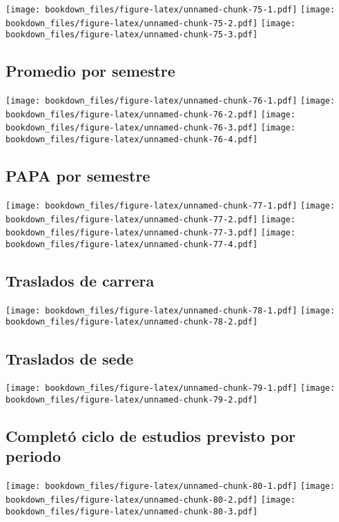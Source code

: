 \documentclass[]{article}
\theoremstyle{definition}
\theoremstyle{definition}
\theoremstyle{definition}
\theoremstyle{remark}
\begin{document}
\texttt{[image: bookdown\_files/figure-latex/unnamed-chunk-75-1.pdf]}
\texttt{[image: bookdown\_files/figure-latex/unnamed-chunk-75-2.pdf]}
\texttt{[image: bookdown\_files/figure-latex/unnamed-chunk-75-3.pdf]}

\subsection{Promedio por semestre}\label{promedio-por-semestre}

\texttt{[image: bookdown\_files/figure-latex/unnamed-chunk-76-1.pdf]}
\texttt{[image: bookdown\_files/figure-latex/unnamed-chunk-76-2.pdf]}
\texttt{[image: bookdown\_files/figure-latex/unnamed-chunk-76-3.pdf]}
\texttt{[image: bookdown\_files/figure-latex/unnamed-chunk-76-4.pdf]}

\subsection{PAPA por semestre}\label{papa-por-semestre}

\texttt{[image: bookdown\_files/figure-latex/unnamed-chunk-77-1.pdf]}
\texttt{[image: bookdown\_files/figure-latex/unnamed-chunk-77-2.pdf]}
\texttt{[image: bookdown\_files/figure-latex/unnamed-chunk-77-3.pdf]}
\texttt{[image: bookdown\_files/figure-latex/unnamed-chunk-77-4.pdf]}

\subsection{Traslados de carrera}\label{traslados-de-carrera}

\texttt{[image: bookdown\_files/figure-latex/unnamed-chunk-78-1.pdf]}
\texttt{[image: bookdown\_files/figure-latex/unnamed-chunk-78-2.pdf]}

\subsection{Traslados de sede}\label{traslados-de-sede}

\texttt{[image: bookdown\_files/figure-latex/unnamed-chunk-79-1.pdf]}
\texttt{[image: bookdown\_files/figure-latex/unnamed-chunk-79-2.pdf]}

\subsection{Completó ciclo de estudios previsto por
periodo}\label{completo-ciclo-de-estudios-previsto-por-periodo}

\texttt{[image: bookdown\_files/figure-latex/unnamed-chunk-80-1.pdf]}
\texttt{[image: bookdown\_files/figure-latex/unnamed-chunk-80-2.pdf]}
\texttt{[image: bookdown\_files/figure-latex/unnamed-chunk-80-3.pdf]}
\end{document}
